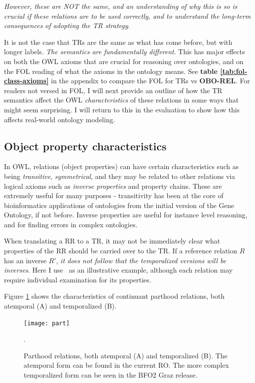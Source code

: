 \documentclass{bioinfo}
\def\partOf{\pr{part\_of}}
\def\OBOREL{\textbf{OBO-REL}}
\begin{document}
\emph{However, these are NOT the same, and an understanding of why
  this is so is crucial if these relations are to be used correctly,
  and to understand the long-term consequences of adopting the TR
  strategy}.

It is not the case that TRs are the same as what has come before, but
with longer labels. \emph{The semantics are fundamentally different}.
This has major effects on both the OWL axioms that are crucial for
reasoning over ontologies, and on the FOL reading of what the axioms
in the ontology means. See \textbf{table \ref{tab:fol-class-axioms}}
in the appendix to compare the FOL for TRs vs \OBOREL. For readers not
versed in FOL, I will next provide an outline of how the TR semantics
affect the OWL \emph{characteristics} of these relations in some ways
that might seem surprising. I will return to this in the evaluation to
show how this affects real-world ontology modeling.

\subsection{Object property characteristics}

In OWL, relations (object properties) can have certain characteristics
such as being \emph{transitive}, \emph{symmetrical}, and they may be
related to other relations via logical axioms such as \emph{inverse
  properties} and property chains. These are extremely useful for many
purposes - transitivity has been at the core of bioinformatics
applications of ontologies from the initial version of the Gene
Ontology\cite{Ashburner2000}, if not before. Inverse properties are
useful for instance level reasoning, and for finding errors in complex
ontologies.

When translating a RR to a TR, it may not be immediately clear what
properties of the RR should be carried over to the TR. If a reference
relation $R$ has an inverse $R'$, \emph{it does not follow that the
temporalized versions will be inverses}. Here I use \partOf\ as an
illustrative example, although each relation may require individual
examination for its properties.

Figure \ref{fig:part} shows the characteristics of continuant parthood
relations, both atemporal (A) and temporalized (B).

\begin{figure}
\center
\texttt{[image: part]}
\caption{Parthood relations, both atemporal (A) and temporalized
  (B). The atemporal form can be found in the current RO. The more
  complex temporalized form can be seen in the BFO2 Graz release. }.
\label{fig:part}
\end{figure}
\end{document}
